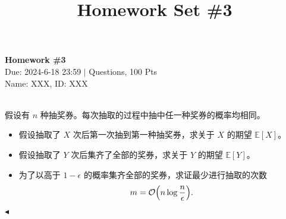 \documentclass[11pt]{article}
\title{Homework Set \#3}
\newenvironment{question}[2][Question]{\begin{trivlist}
\item[\hskip \labelsep {\bfseries #1}\hskip \labelsep {\bfseries #2.}]}{\hfill$\blacktriangleleft$\end{trivlist}}
\newcommand\E{\mathbb{E}}
\begin{document}
    \pagestyle{fancy}
    \chead{}

    \begin{center}
        {\LARGE \bf Homework \#3}\\
        {Due: 2024-6-18 23:59 \quad$|$ Questions, 100 Pts}\\
        {Name: XXX, ID: XXX}
    \end{center}

    \begin{question}{1 (15') (Coupon Collector)}~\\
    假设有 $n$ 种抽奖券。每次抽取的过程中抽中任一种奖券的概率均相同。

    \begin{itemize}
        \item[a (5')] 假设抽取了 $X$ 次后第一次抽到第一种抽奖券，求关于 $X$ 的期望 $\E[X]$。
        \item[b (5')] 假设抽取了 $Y$ 次后集齐了全部的奖券，求关于 $Y$ 的期望 $\E[Y]$。
        \item[c (5')] 为了以高于 $1 - \epsilon$ 的概率集齐全部的奖券，求证最少进行抽取的次数
        \[m = \order{n \log{\frac{n}{\epsilon}}}.\]
    \end{itemize}
    \end{question}
\end{document}
